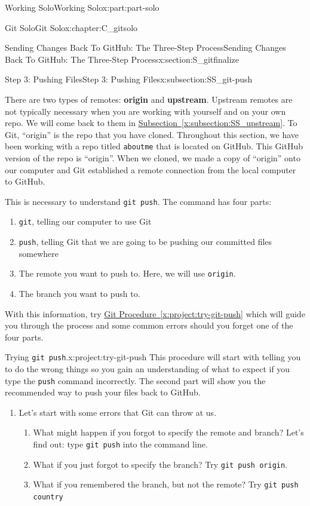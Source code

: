 \documentclass[oneside,10pt,]{book}
\newcommand{\xreffont}{\relax}
\newcommand{\mono}[1]{\texttt{#1}}
\newcommand{\terminology}[1]{\textbf{#1}}
\begin{document}
\begin{partptx}{Working Solo}{}{Working Solo}{}{}{x:part:part-solo}
\begin{chapterptx}{Git Solo}{}{Git Solo}{}{}{x:chapter:C_gitsolo}
\begin{sectionptx}{Sending Changes Back To GitHub: The Three-Step Process}{}{Sending Changes Back To GitHub: The Three-Step Process}{}{}{x:section:S_gitfinalize}
\begin{subsectionptx}{Step 3: Pushing Files}{}{Step 3: Pushing Files}{}{}{x:subsection:SS_git-push}
\par
There are two types of remotes: \terminology{origin} and \terminology{upstream}. Upstream remotes are not typically necessary when you are working with yourself and on your own repo. We will come back to them in \hyperref[x:subsection:SS_upstream]{Subsection~{\xreffont\ref{x:subsection:SS_upstream}}}. To Git, ``origin'' is the repo that you have cloned. Throughout this section, we have been working with a repo titled \mono{aboutme} that is located on GitHub. This GitHub version of the repo is ``origin''. When we cloned, we made a copy of ``origin'' onto our computer and Git established a remote connection from the local computer to GitHub.%
\par
This is necessary to understand \mono{git push}. The command has four parts:%
\begin{enumerate}
\item{}\mono{git}, telling our computer to use Git%
\item{}\mono{push}, telling Git that we are going to be pushing our committed files somewhere%
\item{}The remote you want to push to. Here, we will use \mono{origin}.%
\item{}The branch you want to push to.%
\end{enumerate}
With this information, try \hyperref[x:project:try-git-push]{Git Procedure~{\xreffont\ref{x:project:try-git-push}}} which will guide you through the process and some common errors should you forget one of the four parts.%
\begin{project}{Trying \mono{git push}.}{x:project:try-git-push}%
This procedure will start with telling you to do the wrong things so you gain an understanding of what to expect if you type the \mono{push} command incorrectly. The second part will show you the recommended way to push your files back to GitHub.%
\begin{enumerate}[font=\bfseries,label=(\alph*),ref=\alph*]
\item{}Let's start with some errors that Git can throw at us.%
\begin{enumerate}[font=\bfseries,label=(\roman*),ref=\theenumi.\roman*]
\item{}What might happen if you forgot to specify the remote and branch? Let's find out: type \mono{git push} into the command line.%
\item{}What if you just forgot to specify the branch? Try \mono{git push origin}.%
\item{}What if you remembered the branch, but not the remote? Try \mono{git push country}%

\end{enumerate}
\end{enumerate}
\end{project}
\end{subsectionptx}
\end{sectionptx}
\end{chapterptx}
\end{partptx}
\end{document}
